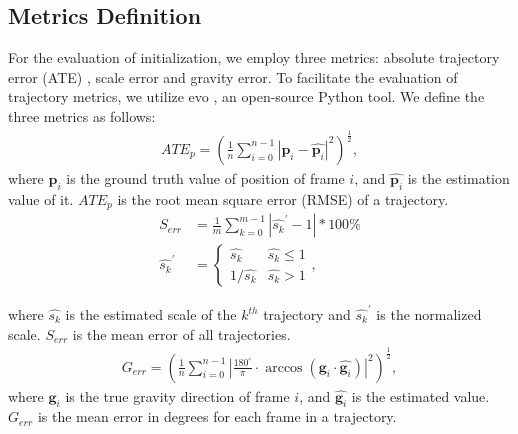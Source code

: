 \subsection{Metrics Definition}
For the evaluation of initialization, we employ three metrics: absolute trajectory error (ATE)\cite{Zhang18iros-Quantitative-Trajectory-Evaluation} , scale error and gravity error. To facilitate the evaluation of trajectory metrics, we utilize evo \cite{grupp2017evo}, an open-source Python tool. We define the three metrics as follows:
\begin{equation}
      \label{ATE}
      \begin{aligned}
{ATE}_{p} = (\frac{1}{n}\sum_{i=0}^{n-1}|\textbf{p}_i - \hat{\textbf{p}_i}|^2)^{\frac{1}{2}},
      \end{aligned}
\end{equation}
    where $\textbf{p}_i$ is the ground truth value of position of frame $i$, and $\hat{\textbf{p}_i}$ is the estimation value of it. $ATE_{p}$ is the root mean square error (RMSE) of a trajectory.
    \begin{equation}
      \label{ScaleError}
      \begin{aligned}
S_{err} &= \frac{1}{m}\sum_{k=0}^{m-1}|\hat{s_k}^{\prime}-1|*100\%\\
    \hat{s_k}^{\prime} &= 
    \begin{cases}
    \hat{s_k}& \hat{s_k}\leq1\\
        1/\hat{s_k}& \hat{s_k}>1
    \end{cases},
      \end{aligned}
\end{equation}

where $\hat{s_k}$  is the estimated scale of the $k^{th}$ trajectory and $\hat{s_k}^{\prime}$ is the normalized scale. $S_{err}$ is the mean error of all trajectories.
\begin{equation}
      \label{GravityError}
      \begin{aligned}
G_{err} = (\frac{1}{n}\sum_{i=0}^{n-1}|
\frac{180^{\circ}}{\pi}\cdot
\arccos({\textbf{g}_i} \cdot \hat{\textbf{g}_i})|^2)^\frac{1}{2},
      \end{aligned}
\end{equation}
where $\textbf{g}_i$ is the true gravity direction of frame $i$, and $\hat{\textbf{g}_i}$ is the estimated value. $G_{err}$ is the mean error in degrees for each frame in a trajectory.

